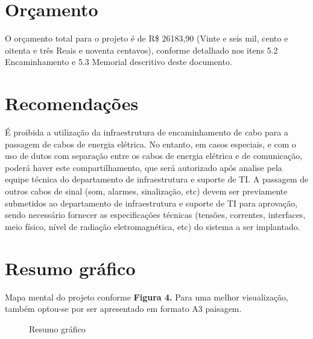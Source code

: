 \documentclass[	DIV=calc,%
							paper=a4,%
							fontsize=12pt,%
							onecolumn]{scrartcl}	 					%
\begin{document}
\section{Orçamento}
O orçamento total para o projeto é de R\$ 26183,90 (Vinte e seis mil, cento e oitenta e três Reais e noventa centavos), conforme detalhado nos itens 5.2 Encaminhamento e 5.3 Memorial descritivo deste documento. 

\section{Recomendações}
É proibida a utilização da infraestrutura de encaminhamento de cabo para a passagem de cabos de energia
elétrica. No entanto, em casos especiais, e com o uso de dutos com separação entre os cabos de energia elétrica e
de comunicação, poderá haver este compartilhamento, que será autorizado após analise pela equipe técnica do
departamento de infraestrutura e suporte de TI. A passagem de outros cabos de sinal (som, alarmes, sinalização, etc) devem ser previamente submetidos ao departamento de infraestrutura e suporte de TI para aprovação, sendo necessário fornecer as especificações técnicas (tensões, correntes, interfaces, meio físico, nível de radiação eletromagnética, etc) do sistema a ser implantado.

\section{Resumo gráfico}

Mapa mental do projeto conforme \textbf{Figura 4.}
Para uma melhor visualização, também optou-se por ser apresentado em formato A3 paisagem.



\clearpage
\thispagestyle{plain}

\recalctypearea


\begin{figure}
	\noindent{}
	\caption{Resumo gráfico}
	\label{mapa_mental}
\end{figure}
\end{document}
